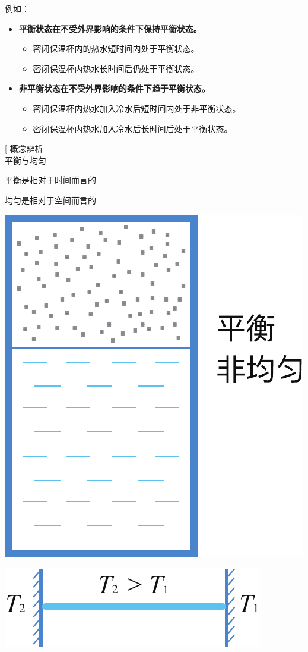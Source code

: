 \noindent 例如：
\begin{itemize}
	\item \textbf{平衡状态在不受外界影响的条件下保持平衡状态。}
	\begin{itemize}
		\item 密闭保温杯内的热水短时间内处于平衡状态。
		\item 密闭保温杯内热水长时间后仍处于平衡状态。
	\end{itemize}
	\item \textbf{非平衡状态在不受外界影响的条件下趋于平衡状态。}
	\begin{itemize}
		\item 密闭保温杯内热水加入冷水后短时间内处于非平衡状态。
		\item 密闭保温杯内热水加入冷水后长时间后处于平衡状态。
	\end{itemize}
\end{itemize}
\warn[
概念辨析\\
\hspace*{1em} 平衡与均匀
\begin{myitemize}
	\item 平衡是相对于时间而言的\vspace*{-0.5em}
	\item 均匀是相对于空间而言的
\end{myitemize}
\rgap
{\centering
{
	\centering
	\begin{minipage}[c]{0.5\linewidth}
	\centering
	\includegraphics[width=0.4\linewidth]{pic/平衡与均匀.pdf}
	\label{ph1}
\end{minipage}%
\begin{minipage}[c]{0.5\linewidth}
	\centering
	\includegraphics[width=0.7\linewidth]{pic/平衡与稳定.pdf}
	\label{ph2}
\end{minipage}%
}
}

